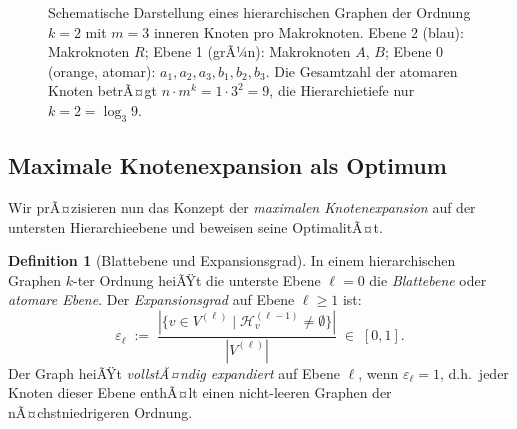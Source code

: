﻿\documentclass[12pt,a4paper,twoside]{article}
\theoremstyle{definition}
\newtheorem{definition}{Definition}[section]
\theoremstyle{plain}
\theoremstyle{remark}
\begin{document}
\begin{figure}[h]
	\centering
	\caption{Schematische Darstellung eines hierarchischen Graphen der
		Ordnung $k=2$ mit $m=3$ inneren Knoten pro Makroknoten.
		Ebene 2 (blau): Makroknoten $R$; Ebene 1 (grÃ¼n):
		Makroknoten $A$, $B$; Ebene 0 (orange, atomar):
		$a_1, a_2, a_3, b_1, b_2, b_3$.  Die Gesamtzahl der
		atomaren Knoten betrÃ¤gt $n \cdot m^k = 1 \cdot 3^2 = 9$,
		die Hierarchietiefe nur $k=2 = \log_3 9$.}
	\label{fig:hierarchie_baum}
\end{figure}

\subsection{Maximale Knotenexpansion als Optimum}
\label{sub:blattebene}

Wir prÃ¤zisieren nun das Konzept der \emph{maximalen Knotenexpansion}
auf der untersten Hierarchieebene und beweisen seine OptimalitÃ¤t.

\begin{definition}[Blattebene und Expansionsgrad]
	\label{def:blatt}
	In einem hierarchischen Graphen $k$-ter Ordnung heiÃŸt die unterste
	Ebene $\ell = 0$ die \emph{Blattebene} oder \emph{atomare Ebene}.
	Der \emph{Expansionsgrad} auf Ebene $\ell \geq 1$ ist:
	\[
	\varepsilon_\ell \;:=\;
	\frac{|\{v \in V^{(\ell)} \mid \mathcal{H}^{(\ell-1)}_v \neq \emptyset\}|}{|V^{(\ell)}|}
	\;\in\; [0,1].
	\]
	Der Graph heiÃŸt \emph{vollstÃ¤ndig expandiert} auf Ebene $\ell$,
	wenn $\varepsilon_\ell = 1$, d.h.\ jeder Knoten dieser Ebene enthÃ¤lt
	einen nicht-leeren Graphen der nÃ¤chstniedrigeren Ordnung.
\end{definition}
\end{document}
